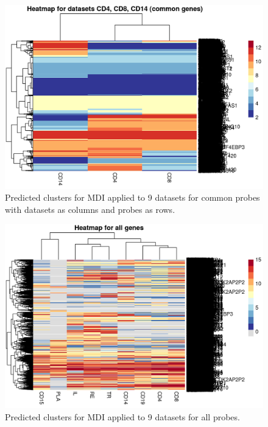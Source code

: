 \documentclass[12pt]{article} %
\begin{document}
	\begin{figure}[h]
		\includegraphics[scale=1.0]{Images/Initial_analysis/sim_heatmaps-3.png}
		\caption{Predicted clusters for MDI applied to 9 datasets for common probes with datasets as columns and probes as rows.}
		\label{fig:naive_mdi_reduced_cd14_cd4_cd8_cluster}
	\end{figure}

	\begin{figure}[h]
	\includegraphics[scale=1.0]{Images/Initial_analysis/mdi_2_heatmap-1.png}
	\caption{Predicted clusters for MDI applied to 9 datasets for all probes.}
	\label{fig:naive_mdi_full}
\end{figure}
	
	\newpage



	
%	
	
	
\end{document}
